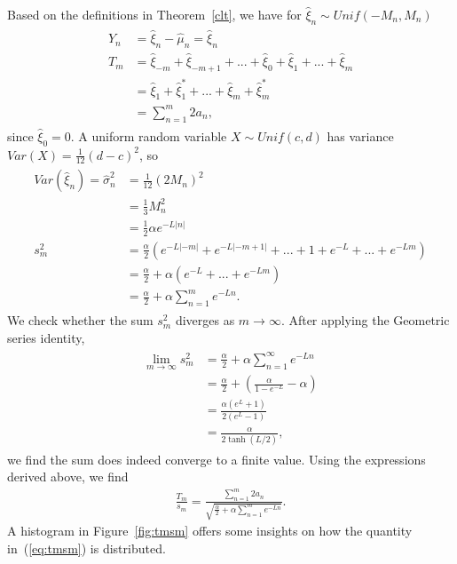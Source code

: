 Based on the definitions in Theorem~\ref{clt}, we have for
$\hat{\xi}_n \sim Unif(-M_n,M_n)$
\begin{align*}
\begin{split}
Y_n &= \hat{\xi}_n - \hat{\mu}_n = \hat{\xi}_n\\
T_m &= \hat{\xi}_{-m}+\hat{\xi}_{-m+1}+ ...+\hat{\xi}_{0}+\hat{\xi}_{1}+...+\hat{\xi}_{m}\\
&=
\hat{\xi}_{1}+\hat{\xi}_{1}^*+...+\hat{\xi}_{m}+\hat{\xi}_{m}^*\\
&= \sum_{n=1}^{m} 2a_n,
\end{split}
\end{align*}
since $\hat{\xi}_{0} = 0$. A uniform random variable $X\sim Unif(c,d)$ has variance
$Var(X) = \frac{1}{12}(d-c)^2$, so
\begin{align*}
\begin{split}
Var(\hat{\xi}_n) = \hat{\sigma}_n^2  &= \frac{1}{12}(2M_n)^2\\
&= \frac{1}{3}M_n^2\\
&= \frac{1}{2}\alpha e^{-L|n|}\\
s_m^2 &= \frac{\alpha}{2}\left(e^{-L|-m|}+e^{-L|-m+1|}+...+1+e^{-L}+...+e^{-Lm} \right)\\
&= \frac{\alpha}{2} + \alpha \left(e^{-L}+... + e^{-Lm} \right)\\
&=\frac{\alpha}{2} +\alpha\sum_{n=1}^m e^{-Ln}.
\end{split}
\end{align*}
We check whether the sum $s_m^2$ diverges as $m \to \infty$. After applying the Geometric series identity,
\begin{align*}
\begin{split}
\lim_{m\to \infty}s_m^2 &=\frac{\alpha}{2} +\alpha\sum_{n=1}^\infty e^{-Ln}\\
&= \frac{\alpha}{2} + \left( \frac{\alpha}{1-e^{-L}}- \alpha\right)\\
&= \frac{\alpha(e^L+1)}{2(e^L-1)}\\
&= \frac{\alpha}{2 \tanh(L/2)},
\end{split}
\end{align*}
we find the sum does indeed converge to a finite value. Using the
expressions derived above, we find 
\begin{align}\label{eq:tmsm}
\frac{T_m}{s_m} = \frac{\sum_{n=1}^{m} 2a_n}{\sqrt{\frac{\alpha}{2} +\alpha\sum_{n=1}^m e^{-Ln}}}. 
\end{align}
A histogram in Figure~\ref{fig:tmsm} offers some insights on how the
quantity in~(\ref{eq:tmsm}) is distributed.
